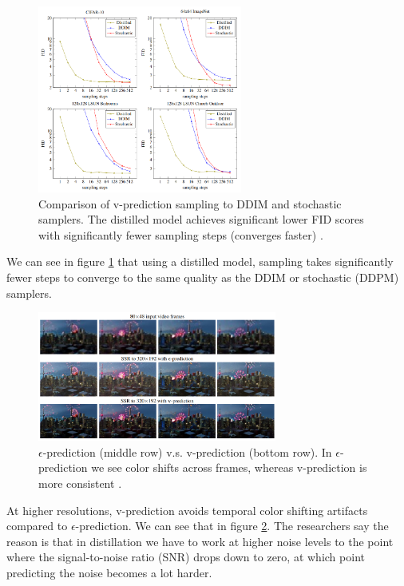 \begin{figure}
    \centering
    \includegraphics[width=0.6\textwidth]{images/imagen_video/samplers_comparison.png}
    \caption{Comparison of v-prediction sampling to DDIM and stochastic samplers. The distilled model achieves significant lower FID scores with significantly fewer sampling steps (converges faster) \cite{v_prediction}.}
    \label{fig:samplers_comparison}
\end{figure}

We can see in figure \ref{fig:samplers_comparison} that using a distilled model, sampling takes significantly fewer steps to converge to the same quality as the DDIM or stochastic (DDPM) samplers.

\begin{figure}
    \centering
    \includegraphics[width=0.7\textwidth]{images/imagen_video/e_prediction_vs_v_prediction.png}
    \caption{$\epsilon$-prediction (middle row) v.s. v-prediction (bottom row). In $\epsilon$-prediction we see color shifts across frames, whereas v-prediction is more consistent \cite{imagen_video}.}
    \label{fig:imagen_video_epsilon_prediction_vs_v_prediction}
\end{figure}

At higher resolutions, v-prediction avoids temporal color shifting artifacts compared to $\epsilon$-prediction. We can see that in figure \ref{fig:imagen_video_epsilon_prediction_vs_v_prediction}. The researchers say the reason is that in distillation we have to work at higher noise levels to the point where the signal-to-noise ratio (SNR) drops down to zero, at which point predicting the noise becomes a lot harder.













